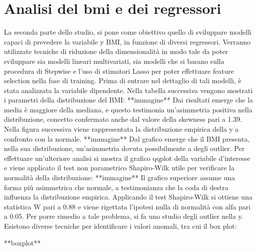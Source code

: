 \section{Analisi del bmi e dei regressori}
La seconda parte dello studio, si pone come obiettivo quello di sviluppare modelli capaci di prevedere la variabile y BMI, in funzione di diversi regressori. Verranno utilizzate tecniche di riduzione della dimensionalità in modo tale da poter sviluppare sia modelli lineari multivariati, sia modelli che si basano sulla procedura di Stepwise e l’uso di stimatori Lasso per poter effettuare feature selection nella fase di training. Prima di entrare nel dettaglio di tali modelli, è stata analizzata la variabile dipendente. Nella tabella successiva vengono mostrati i parametri della distribuzione del BMI:
**immagine** 
Dai risultati emerge che la media è maggiore della mediana, e questo testimonia un’asimmetria positiva nella distribuzione, concetto confermato anche dal valore della skewness pari a 1.39. Nella figura successiva viene rappresentata la distribuzione empirica della y a confronto con la normale. 
**immagine**
Dal grafico emerge che il BMI presenta, nella sua distribuzione, un’asimmetria dovuta possibilmente a degli outlier. Per effettuare un'ulteriore analisi si mostra il grafico qqplot della variabile d'interesse e viene applicato il test non parametrico Shapiro-Wilk utile per verificare la normalità della distribuzione: 
**immagine**
Il grafico superiore assume una forma più asimmetrica che normale, a testimonianza che la coda di destra influenza la distribuzione empirica. Applicando il test Shapiro-Wilk si ottiene una statistica W pari a 0.88 e viene rigettata l’ipotesi nulla di normalità con alfa pari a 0.05. Per porre rimedio a tale problema, si fa uno studio degli outlier nella y. Esistono diverse tecniche per identificare i valori anomali, tra cui il box plot:

**boxplot**


